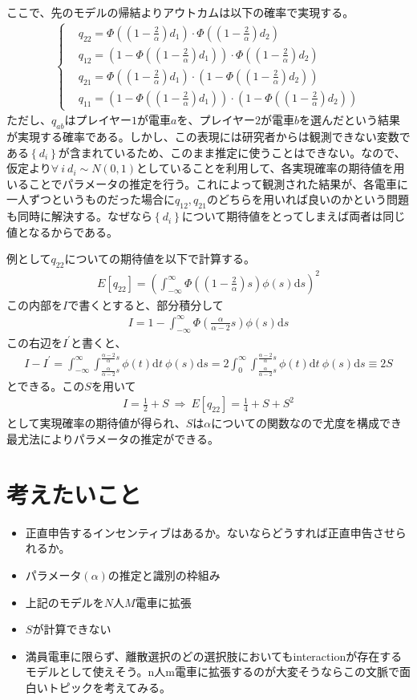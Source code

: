 \documentclass{jsarticle}
\begin{document}
ここで、先のモデルの帰結よりアウトカムは以下の確率で実現する。
\begin{align*}
	\begin{cases}
	&q_{22} = \Phi((1 - \frac{2}{\alpha})d_1) \cdot \Phi((1 - \frac{2}{\alpha})d_2)\\[8pt]
	&q_{12} = (1 - \Phi((1 - \frac{2}{\alpha})d_1)) \cdot \Phi((1 - \frac{2}{\alpha})d_2)\\[8pt]
	&q_{21} = \Phi((1 - \frac{2}{\alpha})d_1) \cdot (1 - \Phi((1 - \frac{2}{\alpha})d_2))\\[8pt]
	&q_{11} = (1 - \Phi((1 - \frac{2}{\alpha})d_1)) \cdot (1 - \Phi((1 - \frac{2}{\alpha})d_2))
	\end{cases}
\end{align*}
ただし、$q_{ab}$はプレイヤー$1$が電車$a$を、プレイヤー$2$が電車$b$を選んだという結果が実現する確率である。しかし、この表現には研究者からは観測できない変数である$\left\{ d_i\right\}$が含まれているため、このまま推定に使うことはできない。なので、仮定より$\forall \ i\ d_i \sim N(0,1)$としていることを利用して、各実現確率の期待値を用いることでパラメータの推定を行う。これによって観測された結果が、各電車に一人ずつというものだった場合に$q_{12}, q_{21}$のどちらを用いれば良いのかという問題も同時に解決する。なぜなら$\left\{ d_i\right\}$について期待値をとってしまえば両者は同じ値となるからである。

例として$q_{22}$についての期待値を以下で計算する。
\begin{align*}
	E[q_{22}] = \left( \int_{-\infty}^{\infty} \Phi \left(\left(1 - \frac{2}{\alpha}\right)s\right) \phi(s) \mathrm{d}s \right)^2
\end{align*}
この内部を$I$で書くとすると、部分積分して
\begin{align*}
	I = 1 - \int_{-\infty}^{\infty} \Phi \left(\frac{\alpha}{\alpha - 2} s\right)\phi(s)\mathrm{d}s
\end{align*}
この右辺を$I^{'}$と書くと、
\begin{align*}
	I - I^{'} = \int_{-\infty}^{\infty} \int_{\frac{\alpha}{\alpha - 2}s}^{\frac{\alpha - 2}{\alpha}s} \phi(t) \mathrm{d}t\ \phi (s) \mathrm{d}s = 2\int_0^{\infty}  \int_{\frac{\alpha}{\alpha - 2}s}^{\frac{\alpha - 2}{\alpha}s} \phi(t) \mathrm{d}t\ \phi (s) \mathrm{d}s \equiv 2S
\end{align*}
とできる。この$S$を用いて
\begin{align*}
	I = \frac{1}{2} + S\ \Rightarrow\ E[q_{22}] = \frac{1}{4} + S + S^2
\end{align*}
として実現確率の期待値が得られ、$S$は$\alpha$についての関数なので尤度を構成でき最尤法によりパラメータの推定ができる。

\section{考えたいこと}
\begin{itemize}
	\item 正直申告するインセンティブはあるか。ないならどうすれば正直申告させられるか。
	\item パラメータ$(\alpha)$の推定と識別の枠組み
	\item 上記のモデルを$N$人$M$電車に拡張
	\item $S$が計算できない
	\item 満員電車に限らず、離散選択のどの選択肢においてもinteractionが存在するモデルとして使えそう。n人m電車に拡張するのが大変そうならこの文脈で面白いトピックを考えてみる。
\end{itemize}
\end{document}

